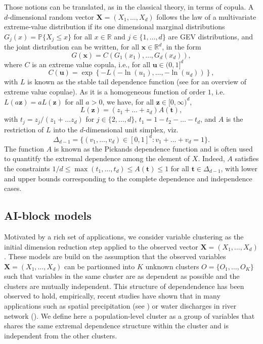 \documentclass[11pt]{article}
\theoremstyle{definition}
\begin{document}
	Those notions can be translated, as in the classical theory, in terms of copula. A $d$-dimensional random vector $\textbf{X} = (X_1, \dots, X_d)$ follows the law of a multivariate extreme-value distribution if its one dimensional marginal distributions $G_j(x) = \mathbb{P}\{X_j \leq x\}$ for all $x \in \mathbb{R}$ and $j \in \{1,\dots,d\}$ are GEV distributions, and the joint distribution can be written, for all $\textbf{x} \in \mathbb{R}^d$, in the form
	\begin{equation}
	\label{eq:ev_cop}
		G(\textbf{x}) = C\left(G_1(x_1), \dots, G_d(x_d)\right),
	\end{equation}
	where $C$ is an extreme value copula, i.e., for all $\textbf{u} \in (0,1]^d$
	\begin{equation*}
		C(\textbf{u}) = \exp\left\{-L\left(-\ln(u_1), \dots, -\ln(u_d)\right)\right\},
	\end{equation*}
	with $L$ is known as the stable tail dependence function (see \cite{gudendorf2010} for an overview of extreme value copulae). As it is a homogeneous function of order $1$, i.e. $L(a\textbf{z}) = a L(\textbf{z})$ for all $a > 0$, we have, for all $\textbf{z} \in [0,\infty)^d$,
	\begin{equation*}
		L(\textbf{z}) = (z_1 + \dots + z_d)A(\textbf{t}),
	\end{equation*}
	with $t_j = z_j / (z_1 + \dots z_d)$ for $j \in \{2,\dots,d\}$, $t_1 = 1-t_2-\dots-t_d$, and $A$ is the restriction of $L$ into the $d$-dimensional unit simplex, viz.
	\begin{equation*}
		\Delta_{d-1} = \{(v_1, \dots, v_d) \in [0,1]^d : v_1 + \dots + v_d = 1\}.
	\end{equation*}
	The function $A$ is known as the Pickands dependence function and is often used to quantitfy the extremal dependence among the element of $X$. Indeed, $A$ satisfies the constraints $1/d \leq \max(t_1, \dots, t_d) \leq A(\textbf{t}) \leq 1$ for all $\textbf{t} \in \Delta_{d-1}$, with lower and upper bounds corresponding to the complete dependence and independence cases.
	
	\subsection{AI-block models} 
	
	Motivated by a rich set of applications, we consider variable clustering as the initial dimension reduction step applied to the observed vector $\textbf{X} = (X_1, \dots, X_d)$. These models are build on the assumption that the observed variables $\textbf{X} = (X_1,\dots, X_d)$ can be partionned into $K$ unknown clusters $O = \{O_1, \dots, O_K\}$ such that variables in the same cluster are as dependent as possible and the clusters are mutually independent. This structure of dependendence has been observed to hold, empirically, recent studies have shown that in many applications such as spatial precipitation (see \cite{lalancette2021rank, le2018dependence}) or water discharges in river network (\cite{fomichov2022spherical}). We define here a population-level cluster as a group of variables that shares the same extremal dependence structure within the cluster and is independent from the other clusters.
	 
\end{document}
